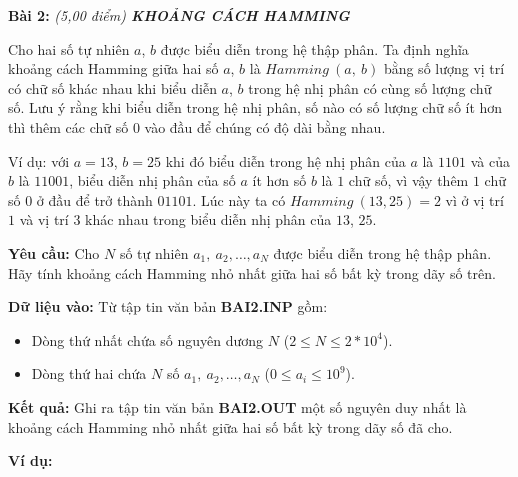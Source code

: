 \documentclass[
]{article}
\begin{document}
\textbf{Bài 2:} \it{(5,00 điểm)} \textbf{KHOẢNG CÁCH HAMMING}

Cho hai số tự nhiên $a$, $b$ được biểu diễn trong hệ thập phân. Ta
định nghĩa khoảng cách Hamming giữa hai số $a$, $b$ là
$Hamming\ (a,\ b)$ bằng số lượng vị trí có chữ số khác nhau khi biểu
diễn $a$, $b$ trong hệ nhị phân có cùng số lượng chữ số. Lưu ý rằng
khi biểu diễn trong hệ nhị phân, số nào có số lượng chữ số ít hơn thì
thêm các chữ số $0$ vào đầu để chúng có độ dài bằng nhau.

Ví dụ: với $a = 13$, $b = 25$ khi đó biểu diễn trong hệ nhị phân của
$a$ là $1101$ và của $b$ là $11001$, biểu diễn nhị phân của số
$a$ ít hơn số $b$ là $1$ chữ số, vì vậy thêm $1$ chữ số $0$ ở
đầu để trở thành $01101$. Lúc này ta có $Hamming\ (13,25) = 2$ vì ở
vị trí $1$ và vị trí $3$ khác nhau trong biểu diễn nhị phân của
$13$, $25$.

\textbf{Yêu cầu:} Cho $N$ số tự nhiên $a_{1},\ a_{2},\ldots,a_{N}$
được biểu diễn trong hệ thập phân. Hãy tính khoảng cách Hamming nhỏ nhất
giữa hai số bất kỳ trong dãy số trên.

\textbf{Dữ liệu vào:} Từ tập tin văn bản \textbf{BAI2.INP} gồm:

\begin{itemize}
\item
  Dòng thứ nhất chứa số nguyên dương $N$
  ($2 \leq N \leq 2*10^4$).
\item
  Dòng thứ hai chứa $N$ số $a_{1},\ a_{2},\ldots,a_{N}$
  ($0 \leq a_{i} \leq 10^{9}$).
\end{itemize}

\textbf{Kết quả:} Ghi ra tập tin văn bản \textbf{BAI2.OUT} một số nguyên
duy nhất là khoảng cách Hamming nhỏ nhất giữa hai số bất kỳ trong dãy số
đã cho.

\textbf{Ví dụ:}
\end{document}

